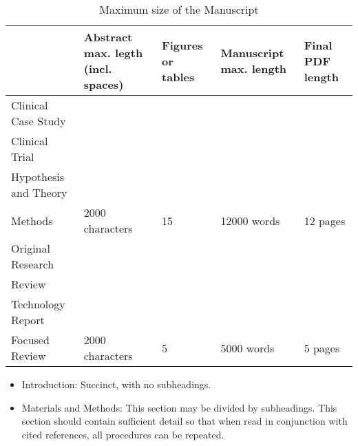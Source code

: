 \begin{table}
\caption{Maximum size of the Manuscript\label{Tab:01}}
{\begin{tabular}{lllll}
 & Abstract max. legth (incl. spaces) & Figures or tables & Manuscript max. length & Final PDF length\\\midrule
Clinical Case Study & & & &\\
Clinical Trial & & & &\\
Hypothesis and Theory & & & &\\
Methods & 2000 characters  & 15 & 12000 words & 12 pages\\
Original Research & & & &\\
Review & & & &\\
Technology Report & & & &\\
Focused Review & 2000 characters & 5 & 5000 words & 5 pages\\
\end{tabular}}{}
\end{table}

\begin{itemize}
\item Introduction: Succinct, with no subheadings.
\item Materials and Methods: This section may be divided by subheadings. This section should contain sufficient detail so that when read in conjunction with cited references, all procedures can be repeated.
\end{itemize}

